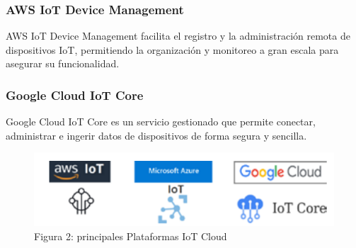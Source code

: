 \documentclass{article}
\begin{document}
\subsubsection{AWS IoT Device Management}
AWS IoT Device Management facilita el registro y la administración remota de dispositivos IoT, permitiendo la organización y monitoreo a gran escala para asegurar su funcionalidad.

\subsubsection{Google Cloud IoT Core}
Google Cloud IoT Core es un servicio gestionado que permite conectar, administrar e ingerir datos de dispositivos de forma segura y sencilla.

\begin{figure}
\centering
\includegraphics[width=0.95\linewidth]{Captura de pantalla 2024-10-18 230908.png}
\caption{\label{fig:frog}Figura 2: principales Plataformas IoT Cloud}
\end{figure}
\end{document}

